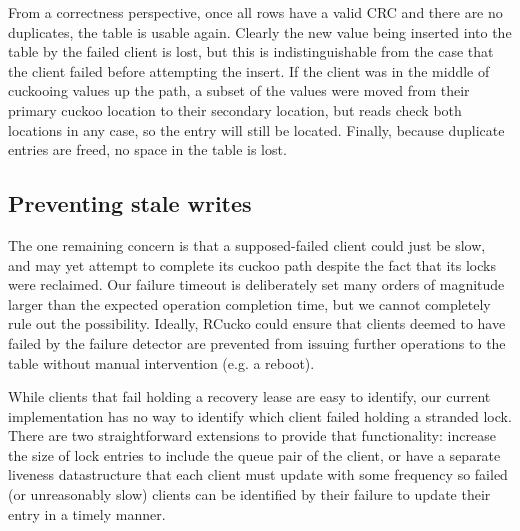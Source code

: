 From a correctness perspective, once all rows have a valid CRC and
there are no duplicates, the table is usable again.  Clearly the new
value being inserted into the table by the failed client is lost, but
this is indistinguishable from the case that the client failed before
attempting the insert.  If the client was in the middle of cuckooing
values up the path, a subset of the values were moved from their
primary cuckoo location to their secondary location, but reads check
both locations in any case, so the entry will still be located.
Finally, because duplicate entries are freed, no space in the table is
lost.

\subsection{Preventing stale writes}
\label{sec:stale-writes}

The one remaining concern is that a supposed-failed client could
just be slow, and may yet attempt to complete its cuckoo path despite
the fact that its locks were reclaimed.
Our failure timeout is
deliberately set many orders of magnitude larger than the expected
operation completion time, but we cannot completely rule out the
possibility.  Ideally, RCucko could ensure that clients deemed to have
failed by the failure detector are prevented from issuing further
operations to the table without manual intervention (e.g. a reboot).


While clients that fail holding a recovery lease are easy to identify,
our current implementation has no way to identify which client failed
holding a stranded lock.  There are two straightforward extensions to
provide that functionality: increase the size of lock entries to
include the queue pair of the client, or have a separate liveness
datastructure that each client must update with some frequency so
failed (or unreasonably slow) clients can be identified by their
failure to update their entry in a timely manner.

